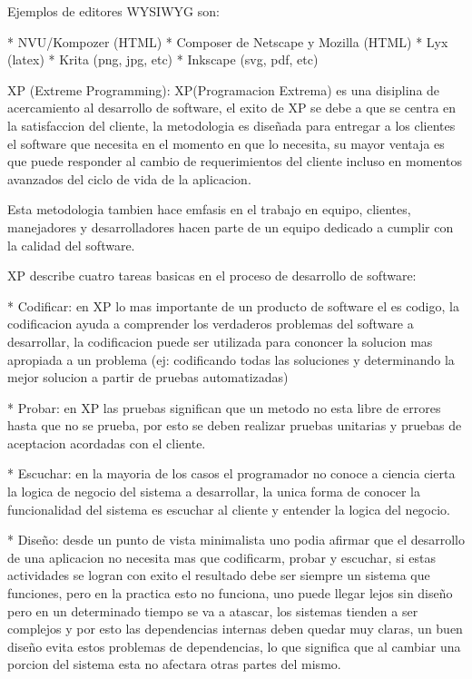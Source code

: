 Ejemplos de editores WYSIWYG son:

* NVU/Kompozer (HTML)
* Composer de Netscape y Mozilla (HTML)
* Lyx (latex)
* Krita (png, jpg, etc)
* Inkscape (svg, pdf, etc)



XP (Extreme Programming):
XP(Programacion Extrema) es una disiplina de acercamiento al desarrollo de software, el exito de XP se debe a que se centra en la satisfaccion del cliente, la metodologia es diseñada para entregar a los clientes el software que necesita en el momento en que lo necesita, su mayor ventaja es que puede responder al cambio de requerimientos del cliente incluso en momentos avanzados del ciclo de vida de la aplicacion.

Esta metodologia tambien hace emfasis en el trabajo en equipo, clientes, manejadores y desarrolladores hacen parte de un equipo dedicado a cumplir con la calidad del software.

XP describe cuatro tareas basicas en el proceso de desarrollo de software:

* Codificar: en XP lo mas importante de un producto de software el es codigo, la codificacion ayuda a comprender los verdaderos problemas del software a desarrollar, la codificacion puede ser utilizada para cononcer la solucion mas apropiada a un problema (ej: codificando todas las soluciones y determinando la mejor solucion a partir de pruebas automatizadas)

* Probar: en XP las pruebas significan que un metodo no esta libre de errores hasta que no se prueba, por esto se deben realizar pruebas unitarias y pruebas de aceptacion acordadas con el cliente.

* Escuchar: en la mayoria de los casos el programador no conoce a ciencia cierta la logica de negocio del sistema a desarrollar, la unica forma de conocer la funcionalidad del sistema es escuchar al cliente y entender la logica del negocio.

* Diseño: desde un punto de vista minimalista uno podia afirmar que el desarrollo de una aplicacion no necesita mas que codificarm, probar y escuchar, si estas actividades se logran con exito el resultado debe ser siempre un sistema que funciones, pero en la practica esto no funciona, uno puede llegar lejos sin diseño pero en un determinado tiempo se va a atascar, los sistemas tienden a ser complejos y por esto las dependencias internas deben quedar muy claras, un buen diseño evita estos problemas de dependencias, lo que significa que al cambiar una porcion del sistema esta no afectara otras partes del mismo.

